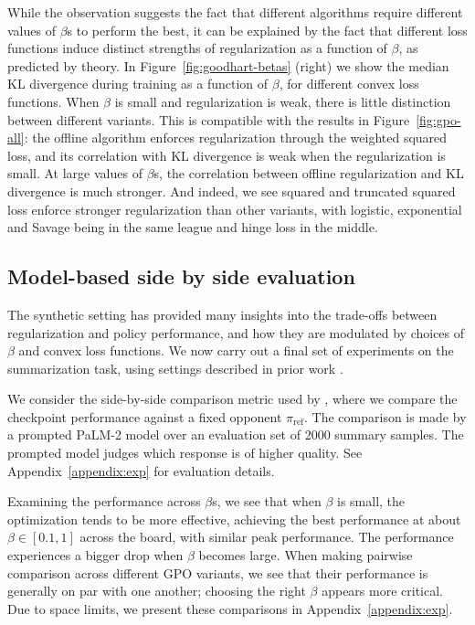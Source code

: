 While the observation suggests the fact that different algorithms require different values of $\beta$s to perform the best, it can be explained by the fact that different loss functions induce distinct strengths of regularization as a function of $\beta$, as predicted by theory. In Figure~\ref{fig:goodhart-betas} (right) we show the median KL divergence during training as a function of $\beta$, for different convex loss functions. When $\beta$ is small and regularization is weak, there is little distinction between different variants. This is compatible with the results in Figure~\ref{fig:gpo-all}: the offline algorithm enforces regularization through the weighted squared loss, and its correlation with KL divergence is weak when the regularization is small. At large values of $\beta$s, the correlation between offline regularization and KL divergence is much stronger. And indeed, we see squared and truncated squared loss enforce stronger regularization than other variants, with logistic, exponential and Savage being in the same league and hinge loss in the middle.

\subsection{Model-based side by side evaluation}

The synthetic setting has provided many insights into the trade-offs between regularization and policy performance, and how they are modulated by choices of $\beta$ and convex loss functions. We now carry out a final set of experiments on the summarization task, using settings described in prior work \citep{munos2023nash,calandriello2024human}.

We consider the side-by-side comparison metric used by \citet{munos2023nash}, where we compare the checkpoint performance against a fixed opponent $\pi_\text{ref}$. The comparison is made by a prompted PaLM-2 model \citep{anil2023palm} over an evaluation set of $2000$ summary samples. The prompted model judges which response is of higher quality. See Appendix~\ref{appendix:exp} for evaluation details.

Examining the performance across $\beta$s, we see that when $\beta$ is small, the optimization tends to be more effective, achieving the best performance at about $\beta\in[0.1,1]$ across the board, with similar peak performance. The performance experiences a bigger drop when $\beta$ becomes large. When making pairwise comparison across different GPO variants, we see that their performance is generally on par with one another; choosing the right $\beta$ appears more critical. Due to space limits, we present these comparisons in Appendix~\ref{appendix:exp}.

